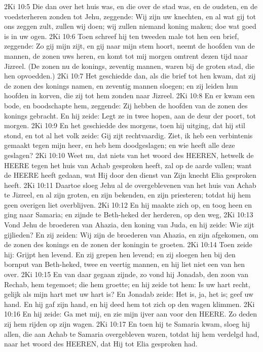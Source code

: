 2Ki 10:5  Die dan over het huis was, en die over de stad was, en de oudsten, en de voedsterheren zonden tot Jehu, zeggende: Wij zijn uw knechten, en al wat gij tot ons zeggen zult, zullen wij doen; wij zullen niemand koning maken; doe wat goed is in uw ogen.
2Ki 10:6  Toen schreef hij ten tweeden male tot hen een brief, zeggende: Zo gij mijn zijt, en gij naar mijn stem hoort, neemt de hoofden van de mannen, de zonen uws heren, en komt tot mij morgen omtrent dezen tijd naar Jizreel. (De zonen nu de konings, zeventig mannen, waren bij de groten stad, die hen opvoedden.)
2Ki 10:7  Het geschiedde dan, als die brief tot hen kwam, dat zij de zonen des konings namen, en zeventig mannen sloegen; en zij leiden hun hoofden in korven, die zij tot hem zonden naar Jizreel.
2Ki 10:8  En er kwam een bode, en boodschapte hem, zeggende: Zij hebben de hoofden van de zonen des konings gebracht. En hij zeide: Legt ze in twee hopen, aan de deur der poort, tot morgen.
2Ki 10:9  En het geschiedde des morgens, toen hij uitging, dat hij stil stond, en tot al het volk zeide: Gij zijt rechtvaardig. Ziet, ik heb een verbintenis gemaakt tegen mijn heer, en heb hem doodgeslagen; en wie heeft alle deze geslagen?
2Ki 10:10  Weet nu, dat niets van het woord des HEEREN, hetwelk de HEERE tegen het huis van Achab gesproken heeft, zal op de aarde vallen; want de HEERE heeft gedaan, wat Hij door den dienst van Zijn knecht Elia gesproken heeft.
2Ki 10:11  Daartoe sloeg Jehu al de overgeblevenen van het huis van Achab te Jizreel, en al zijn groten, en zijn bekenden, en zijn priesteren; totdat hij hem geen overigen liet overblijven.
2Ki 10:12  En hij maakte zich op, en toog heen en ging naar Samaria; en zijnde te Beth-heked der herderen, op den weg,
2Ki 10:13  Vond Jehu de broederen van Ahazia, den koning van Juda, en hij zeide: Wie zijt gijlieden? En zij zeiden: Wij zijn de broederen van Ahazia, en zijn afgekomen, om de zonen des konings en de zonen der koningin te groeten.
2Ki 10:14  Toen zeide hij: Grijpt hen levend. En zij grepen hen levend; en zij sloegen hen bij den bornput van Beth-heked, twee en veertig mannen, en hij liet niet een van hen over.
2Ki 10:15  En van daar gegaan zijnde, zo vond hij Jonadab, den zoon van Rechab, hem tegemoet; die hem groette; en hij zeide tot hem: Is uw hart recht, gelijk als mijn hart met uw hart is? En Jonadab zeide: Het is, ja, het is; geef uw hand. En hij gaf zijn hand, en hij deed hem tot zich op den wagen klimmen.
2Ki 10:16  En hij zeide: Ga met mij, en zie mijn ijver aan voor den HEERE. Zo deden zij hem rijden op zijn wagen.
2Ki 10:17  En toen hij te Samaria kwam, sloeg hij allen, die aan Achab te Samaria overgebleven waren, totdat hij hem verdelgd had, naar het woord des HEEREN, dat Hij tot Elia gesproken had.

